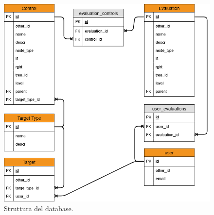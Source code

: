 \begin{figure}
    \centering
    \includegraphics[scale=0.6]{images/MoonCloudRecommendation_ER.png}
    \caption{Struttura del database.}
    \label{fig:str_db_project}
\end{figure}
%
\newpage
%
